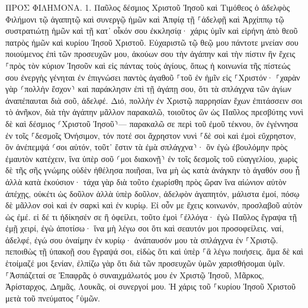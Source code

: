 \documentclass[twoside, 9pt]{extreport}
\begin{document}
ΠΡΟΣ ΦΙΛΗΜΟΝΑ.
1.
Παῦλος δέσμιος Χριστοῦ Ἰησοῦ καὶ Τιμόθεος ὁ ἀδελφὸς Φιλήμονι τῷ ἀγαπητῷ καὶ συνεργῷ ἡμῶν 
καὶ Ἀπφίᾳ τῇ ⸀ἀδελφῇ καὶ Ἀρχίππῳ τῷ συστρατιώτῃ ἡμῶν καὶ τῇ κατ᾽ οἶκόν σου ἐκκλησίᾳ· 
χάρις ὑμῖν καὶ εἰρήνη ἀπὸ θεοῦ πατρὸς ἡμῶν καὶ κυρίου Ἰησοῦ Χριστοῦ. 
Εὐχαριστῶ τῷ θεῷ μου πάντοτε μνείαν σου ποιούμενος ἐπὶ τῶν προσευχῶν μου, 
ἀκούων σου τὴν ἀγάπην καὶ τὴν πίστιν ἣν ἔχεις ⸀πρὸς τὸν κύριον Ἰησοῦν καὶ εἰς πάντας τοὺς ἁγίους, 
ὅπως ἡ κοινωνία τῆς πίστεώς σου ἐνεργὴς γένηται ἐν ἐπιγνώσει παντὸς ἀγαθοῦ ⸀τοῦ ἐν ἡμῖν εἰς ⸀Χριστόν· 
⸀χαρὰν γὰρ ⸂πολλὴν ἔσχον⸃ καὶ παράκλησιν ἐπὶ τῇ ἀγάπῃ σου, ὅτι τὰ σπλάγχνα τῶν ἁγίων ἀναπέπαυται διὰ σοῦ, ἀδελφέ. 
Διό, πολλὴν ἐν Χριστῷ παρρησίαν ἔχων ἐπιτάσσειν σοι τὸ ἀνῆκον, 
διὰ τὴν ἀγάπην μᾶλλον παρακαλῶ, τοιοῦτος ὢν ὡς Παῦλος πρεσβύτης νυνὶ δὲ καὶ δέσμιος ⸂Χριστοῦ Ἰησοῦ⸃— 
παρακαλῶ σε περὶ τοῦ ἐμοῦ τέκνου, ὃν ἐγέννησα ἐν τοῖς ⸀δεσμοῖς Ὀνήσιμον, 
τόν ποτέ σοι ἄχρηστον νυνὶ ⸀δὲ σοὶ καὶ ἐμοὶ εὔχρηστον, 
ὃν ἀνέπεμψά ⸂σοι αὐτόν, τοῦτ᾽ ἔστιν τὰ ἐμὰ σπλάγχνα⸃· 
ὃν ἐγὼ ἐβουλόμην πρὸς ἐμαυτὸν κατέχειν, ἵνα ὑπὲρ σοῦ ⸂μοι διακονῇ⸃ ἐν τοῖς δεσμοῖς τοῦ εὐαγγελίου, 
χωρὶς δὲ τῆς σῆς γνώμης οὐδὲν ἠθέλησα ποιῆσαι, ἵνα μὴ ὡς κατὰ ἀνάγκην τὸ ἀγαθόν σου ᾖ ἀλλὰ κατὰ ἑκούσιον· 
τάχα γὰρ διὰ τοῦτο ἐχωρίσθη πρὸς ὥραν ἵνα αἰώνιον αὐτὸν ἀπέχῃς, 
οὐκέτι ὡς δοῦλον ἀλλὰ ὑπὲρ δοῦλον, ἀδελφὸν ἀγαπητόν, μάλιστα ἐμοί, πόσῳ δὲ μᾶλλον σοὶ καὶ ἐν σαρκὶ καὶ ἐν κυρίῳ. 
Εἰ οὖν με ἔχεις κοινωνόν, προσλαβοῦ αὐτὸν ὡς ἐμέ. 
εἰ δέ τι ἠδίκησέν σε ἢ ὀφείλει, τοῦτο ἐμοὶ ⸀ἐλλόγα· 
ἐγὼ Παῦλος ἔγραψα τῇ ἐμῇ χειρί, ἐγὼ ἀποτίσω· ἵνα μὴ λέγω σοι ὅτι καὶ σεαυτόν μοι προσοφείλεις. 
ναί, ἀδελφέ, ἐγώ σου ὀναίμην ἐν κυρίῳ· ἀνάπαυσόν μου τὰ σπλάγχνα ἐν ⸀Χριστῷ. 
πεποιθὼς τῇ ὑπακοῇ σου ἔγραψά σοι, εἰδὼς ὅτι καὶ ὑπὲρ ⸀ἃ λέγω ποιήσεις. 
ἅμα δὲ καὶ ἑτοίμαζέ μοι ξενίαν, ἐλπίζω γὰρ ὅτι διὰ τῶν προσευχῶν ὑμῶν χαρισθήσομαι ὑμῖν. 
⸀Ἀσπάζεταί σε Ἐπαφρᾶς ὁ συναιχμάλωτός μου ἐν Χριστῷ Ἰησοῦ, 
Μᾶρκος, Ἀρίσταρχος, Δημᾶς, Λουκᾶς, οἱ συνεργοί μου. 
Ἡ χάρις τοῦ ⸀κυρίου Ἰησοῦ Χριστοῦ μετὰ τοῦ πνεύματος ⸀ὑμῶν. 
\end{document}
